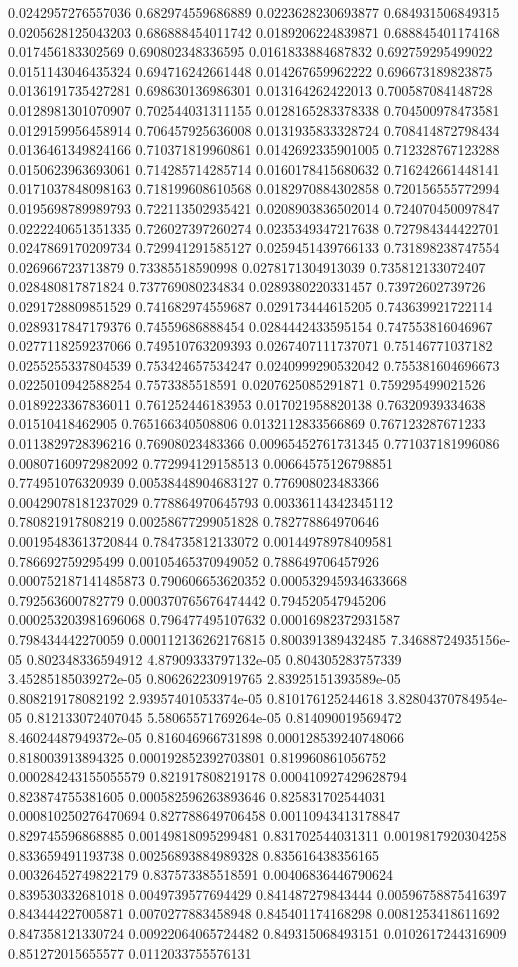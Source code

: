 \begin{table}
\begin{tabu}
\begin{sparkline}{10}
0.0242957276557036 0.682974559686889 0.0223628230693877 0.684931506849315 0.0205628125043203 0.686888454011742 0.0189206224839871 0.688845401174168 0.017456183302569 0.690802348336595 0.0161833884687832 0.692759295499022 0.0151143046435324 0.694716242661448 0.014267659962222 0.696673189823875 0.0136191735427281 0.698630136986301 0.013164262422013 0.700587084148728 0.0128981301070907 0.702544031311155 0.0128165283378338 0.704500978473581 0.0129159956458914 0.706457925636008 0.0131935833328724 0.708414872798434 0.0136461349824166 0.710371819960861 0.0142692335901005 0.712328767123288 0.0150623963693061 0.714285714285714 0.0160178415680632 0.716242661448141 0.0171037848098163 0.718199608610568 0.0182970884302858 0.720156555772994 0.0195698789989793 0.722113502935421 0.0208903836502014 0.724070450097847 0.0222240651351335 0.726027397260274 0.0235349347217638 0.727984344422701 0.0247869170209734 0.729941291585127 0.0259451439766133 0.731898238747554 0.026966723713879 0.73385518590998 0.0278171304913039 0.735812133072407 0.028480817871824 0.737769080234834 0.0289380220331457 0.73972602739726 0.0291728809851529 0.741682974559687 0.029173444615205 0.743639921722114 0.0289317847179376 0.74559686888454 0.0284442433595154 0.747553816046967 0.0277118259237066 0.749510763209393 0.0267407111737071 0.75146771037182 0.0255255337804539 0.753424657534247 0.0240999290532042 0.755381604696673 0.0225010942588254 0.7573385518591 0.0207625085291871 0.759295499021526 0.0189223367836011 0.761252446183953 0.017021958820138 0.76320939334638 0.01510418462905 0.765166340508806 0.0132112833566869 0.767123287671233 0.0113829728396216 0.76908023483366 0.00965452761731345 0.771037181996086 0.00807160972982092 0.772994129158513 0.00664575126798851 0.774951076320939 0.00538448904683127 0.776908023483366 0.00429078181237029 0.778864970645793 0.00336114342345112 0.780821917808219 0.00258677299051828 0.782778864970646 0.00195483613720844 0.784735812133072 0.00144978978409581 0.786692759295499 0.00105465370949052 0.788649706457926 0.000752187141485873 0.790606653620352 0.000532945934633668 0.792563600782779 0.000370765676474442 0.794520547945206 0.000253203981696068 0.796477495107632 0.00016982372931587 0.798434442270059 0.000112136262176815 0.800391389432485 7.34688724935156e-05 0.802348336594912 4.87909333797132e-05 0.804305283757339 3.45285185039272e-05 0.806262230919765 2.83925151393589e-05 0.808219178082192 2.93957401053374e-05 0.810176125244618 3.82804370784954e-05 0.812133072407045 5.58065571769264e-05 0.814090019569472 8.46024487949372e-05 0.816046966731898 0.000128539240748066 0.818003913894325 0.000192852392703801 0.819960861056752 0.000284243155055579 0.821917808219178 0.000410927429628794 0.823874755381605 0.000582596263893646 0.825831702544031 0.000810250276470694 0.827788649706458 0.00110943413178847 0.829745596868885 0.00149818095299481 0.831702544031311 0.0019817920304258 0.833659491193738 0.00256893884989328 0.835616438356165 0.00326452749822179 0.837573385518591 0.00406836446790624 0.839530332681018 0.0049739577694429 0.841487279843444 0.00596758875416397 0.843444227005871 0.0070277883458948 0.845401174168298 0.0081253418611692 0.847358121330724 0.00922064065724482 0.849315068493151 0.0102617244316909 0.851272015655577 0.0112033755576131 
\end{sparkline}
\end{tabu}
\end{table}

